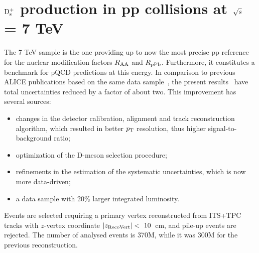 \chapter{${\rm D_s^+}$ production in pp collisions at $\sqrt{s}$ = 7 TeV}
\label{chap:pp}
The 7 TeV sample is the one providing up to now the most precise pp reference for
the nuclear modification factors $R_{\rm AA}$ and $R_{\rm pPb}$. 
Furthermore, it constitutes a benchmark for pQCD predictions
at this energy.
In comparison to previous ALICE publications based on the same data 
sample~\cite{ALICE:2011aa,Abelev:2012tca,Adam:2016ich}, the present 
results~\cite{Acharya:2017jgo} have total uncertainties reduced by a factor of about two. This improvement 
has several sources: 
\begin{itemize}
\item changes in the detector calibration, alignment and track reconstruction 
algorithm, which resulted in better $p_{\rm T}$ resolution, thus higher signal-to-background ratio; 
\item optimization of the D-meson selection procedure; 
\item refinements in the estimation of the systematic uncertainties, which is now more data-driven;
\item a data sample with 20\% larger integrated luminosity.
\end{itemize} 
Events are selected requiring a primary vertex reconstructed from ITS+TPC tracks with 
$z$-vertex coordinate $|z_{\rm RecoVert}|<~10$~cm, 
and pile-up events are rejected.  
The number of analysed events is 370M, while it was 300M for the previous reconstruction.


